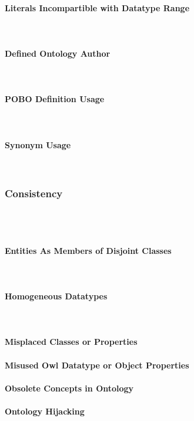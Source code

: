 \paragraph{Literals Incompartible with Datatype Range} ~\\ 

\paragraph{Defined Ontology Author} ~\\ 
\paragraph{POBO Definition Usage}~\\ 
\paragraph{Synonym Usage}~\\ 
\subsubsection{Consistency}~\\ 
\

\paragraph{Entities As Members of Disjoint Classes}~\\


\paragraph{Homogeneous Datatypes}~\\
 
\paragraph{Misplaced Classes or Properties}
\paragraph{Misused Owl Datatype or Object Properties}
\paragraph{Obsolete Concepts in Ontology}
\paragraph{Ontology Hijacking}
